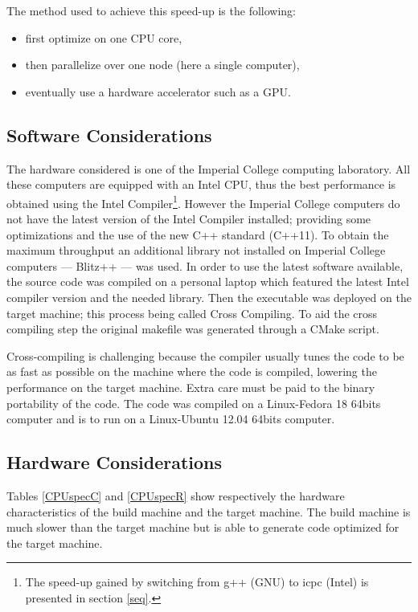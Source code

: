 \documentclass[fleqn,11pt]{SelfArx} %
\theoremstyle{definition}
\begin{document}
The method used to achieve this speed-up is the following:
\begin{itemize}  \vspace{-4mm}
\item first optimize on one CPU core, \vspace{-4mm}
\item then parallelize over one node (here a single computer), \vspace{-4mm}
\item eventually use a hardware accelerator such as a GPU.
\end{itemize}

\subsection{Software Considerations}

The hardware considered is one of the Imperial College computing laboratory. All these computers are equipped with an Intel CPU, thus the best performance is obtained using the Intel Compiler\footnote{The speed-up gained by switching from g++ (GNU) to icpc (Intel) is presented in section \ref{seq}.}. However the Imperial College computers do not have the latest version of the Intel Compiler installed; providing some optimizations and the use of the new C++ standard (C++11). To obtain the maximum throughput an additional library not installed on Imperial College computers --- Blitz++ --- was used. In order to use the latest software available, the source code was compiled on a personal laptop which featured the latest Intel compiler version and the needed library. Then the executable was deployed on the target machine; this process being called Cross Compiling. To aid the cross compiling step the original makefile was generated through a CMake script.

Cross-compiling is challenging because the compiler usually tunes the code to be as fast as possible on the machine where the code is compiled, lowering the performance on the target machine. Extra care must be paid to the binary portability of the code. The code was compiled on a Linux-Fedora 18 64bits computer and is to run on a Linux-Ubuntu 12.04 64bits computer.


\FloatBarrier
\subsection{Hardware Considerations}

Tables \ref{CPUspecC} and \ref{CPUspecR} show respectively the hardware characteristics of the build machine and the target machine. The build machine is much slower than the target machine but is able to generate code optimized for the target machine.
\end{document}
